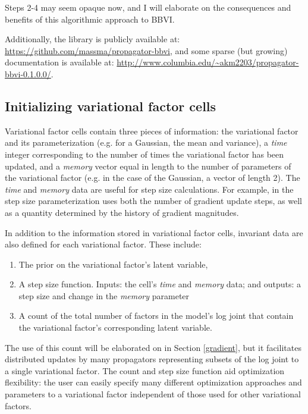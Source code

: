 \documentclass[12pt]{article}
\begin{document}
Steps 2-4 may seem opaque now, and I will elaborate on the
consequences and benefits of this algorithmic approach to BBVI.

Additionally, the library is publicly available at:
\url{https://github.com/massma/propagator-bbvi}, and some sparse (but
growing) documentation is available at:
\url{http://www.columbia.edu/~akm2203/propagator-bbvi-0.1.0.0/}.

\subsection{Initializing variational factor cells}

Variational factor cells contain three pieces of information: the
variational factor and its parameterization (e.g. for a Gaussian, the
mean and variance), a \textit{time} integer corresponding to the
number of times the variational factor has been updated, and a
\textit{memory} vector equal in length to the number of parameters of
the variational factor (e.g. in the case of the Gaussian, a vector of
length 2). The \textit{time} and \textit{memory} data are useful for
step size calculations. For example, in \citet{kuc-2017} the step size
parameterization uses both the number of gradient update steps, as
well as a quantity determined by the history of gradient magnitudes.

In addition to the information stored in variational factor cells,
invariant data are also defined for each variational factor. These
include:

\begin{enumerate}
  \item The prior on the variational factor's latent variable,
  \item A step size function. Inputs: the cell's \textit{time} and
    \textit{memory} data; and outputs: a step size and change in the
    \textit{memory} parameter
  \item A count of the total number of factors in the model's log
    joint that contain the variational factor's corresponding latent
    variable.
\end{enumerate}

The use of this count will be elaborated on in Section \ref{gradient},
but it facilitates distributed updates by many propagators
representing subsets of the log joint to a single variational
factor. The count and step size function aid optimization flexibility:
the user can easily specify many different optimization approaches
and parameters to a variational factor independent of those used
for other variational factors.
\end{document}
